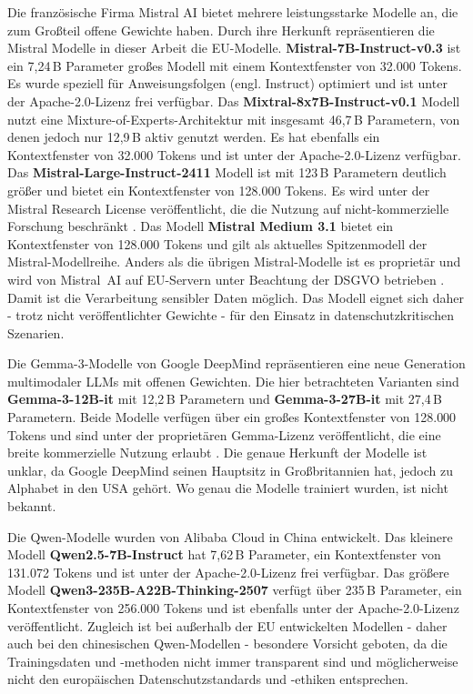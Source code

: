 Die französische Firma Mistral AI bietet mehrere leistungsstarke Modelle an, die zum Großteil offene Gewichte haben. Durch ihre Herkunft repräsentieren die Mistral Modelle in dieser Arbeit die \ac{EU}-Modelle. \textbf{Mistral-7B-Instruct-v0.3} \cite{HF_Mistral7B_2025} ist ein 7,24\,B Parameter großes Modell mit einem Kontextfenster von 32{.}000 Tokens. Es wurde speziell für Anweisungsfolgen (engl. Instruct) optimiert und ist unter der Apache-2.0-Lizenz frei verfügbar. Das \textbf{Mixtral-8x7B-Instruct-v0.1} Modell \cite{HF_Mixtral8x7B_2025} nutzt eine Mixture-of-Experts-Architektur mit insgesamt 46,7\,B Parametern, von denen jedoch nur 12,9\,B aktiv genutzt werden. Es hat ebenfalls ein Kontextfenster von 32{.}000 Tokens und ist unter der Apache-2.0-Lizenz verfügbar. Das \textbf{Mistral-Large-Instruct-2411} Modell \cite{HF_MistralLargeInstruct_2025} ist mit 123\,B Parametern deutlich größer und bietet ein Kontextfenster von 128{.}000 Tokens. Es wird unter der Mistral Research License veröffentlicht, die die Nutzung auf nicht-kommerzielle Forschung beschränkt \cite{MRL_Research_License}. Das Modell \textbf{Mistral Medium 3.1} \cite{mistral_models_overview} bietet ein Kontextfenster von 128{.}000 Tokens und gilt als aktuelles Spitzenmodell der Mistral-Modellreihe. Anders als die übrigen Mistral-Modelle ist es proprietär und wird von Mistral~AI auf \ac{EU}-Servern unter Beachtung der \ac{DSGVO} betrieben \cite{mistral-gdpr, mistral-data-storing}. Damit ist die Verarbeitung sensibler Daten möglich. Das Modell eignet sich daher - trotz nicht veröffentlichter Gewichte - für den Einsatz in datenschutzkritischen Szenarien.

Die Gemma-3-Modelle von Google DeepMind repräsentieren eine neue Generation multimodaler \acp{LLM} mit offenen Gewichten. Die hier betrachteten Varianten sind \textbf{Gemma-3-12B-it} \cite{HF_Gemma3_12B_2025} mit 12,2\,B Parametern und \textbf{Gemma-3-27B-it} \cite{HF_Gemma3_27B_2025} mit 27,4\,B Parametern. Beide Modelle verfügen über ein großes Kontextfenster von 128{.}000 Tokens und sind unter der proprietären Gemma-Lizenz veröffentlicht, die eine breite kommerzielle Nutzung erlaubt \cite{Gemma3_License}. Die genaue Herkunft der Modelle ist unklar, da Google DeepMind seinen Hauptsitz in Großbritannien hat, jedoch zu Alphabet in den USA gehört. Wo genau die Modelle trainiert wurden, ist nicht bekannt.

Die Qwen-Modelle wurden von Alibaba Cloud in China entwickelt. Das kleinere Modell \textbf{Qwen2.5-7B-Instruct} \cite{HF_Qwen7B_2025} hat 7,62\,B Parameter, ein Kontextfenster von 131{.}072 Tokens und ist unter der Apache-2.0-Lizenz frei verfügbar. Das größere Modell \textbf{Qwen3-235B-A22B-Thinking-2507} \cite{HF_Qwen3_235B_2025} verfügt über 235\,B Parameter, ein Kontextfenster von 256{.}000 Tokens und ist ebenfalls unter der Apache-2.0-Lizenz veröffentlicht. Zugleich ist bei außerhalb der \ac{EU} entwickelten Modellen - daher auch bei den chinesischen Qwen-Modellen - besondere Vorsicht geboten, da die Trainingsdaten und -methoden nicht immer transparent sind und möglicherweise nicht den europäischen Datenschutzstandards und -ethiken entsprechen.

